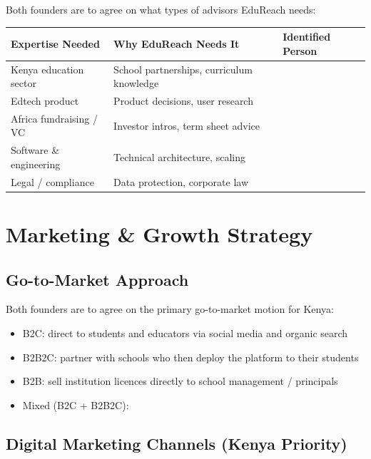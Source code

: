 \documentclass[12pt,a4paper]{article}
\newcommand{\blank}[1][5.5cm]{\underline{\hspace{#1}}}
\newcommand{\cb}{$\square$\;}                   %
\begin{document}
Both founders are to agree on what types of advisors EduReach needs:

\begin{tabularx}{\linewidth}{L{4cm} L{5cm} C{3cm}}
  \toprule
  \textbf{Expertise Needed} & \textbf{Why EduReach Needs It} & \textbf{Identified Person} \\
  \midrule
  Kenya education sector      & School partnerships, curriculum knowledge & \blank[2.5cm] \\[0.4em]
  Edtech product              & Product decisions, user research          & \blank[2.5cm] \\[0.4em]
  Africa fundraising / VC     & Investor intros, term sheet advice        & \blank[2.5cm] \\[0.4em]
  Software \& engineering     & Technical architecture, scaling           & \blank[2.5cm] \\[0.4em]
  Legal / compliance          & Data protection, corporate law            & \blank[2.5cm] \\
  \bottomrule
\end{tabularx}

\section{Marketing \& Growth Strategy}

\subsection{Go-to-Market Approach}

Both founders are to agree on the primary go-to-market motion for Kenya:

\begin{itemize}[label=\cb]
  \item B2C: direct to students and educators via social media and organic search
  \item B2B2C: partner with schools who then deploy the platform to their students
  \item B2B: sell institution licences directly to school management / principals
  \item Mixed (B2C + B2B2C): \blank[6cm]
\end{itemize}

\subsection{Digital Marketing Channels (Kenya Priority)}
\end{document}
